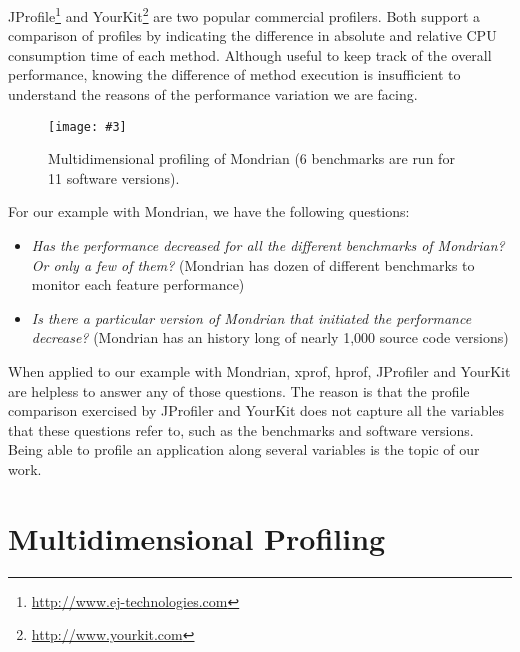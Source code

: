 \documentclass[10pt, conference, compsocconf]{IEEEtran}
\newcommand{\largefig}[4]{
	\begin{figure*}[#1]
		\centering
		\texttt{[image: \#3]}
		\caption{\label{fig:#3}#4}
	\end{figure*}}
\begin{document}
JProfile\footnote{\url{http://www.ej-technologies.com}} and YourKit\footnote{\url{http://www.yourkit.com}} are two popular commercial profilers. Both support a comparison of profiles by indicating the difference in absolute and relative CPU consumption time of each method. Although useful to keep track of the overall performance, knowing the difference of method execution is insufficient to understand the reasons of the performance variation we are facing. 

\largefig{}{1.0}{final2}{Multidimensional profiling of Mondrian (6 benchmarks are run for 11 software versions).}

For our example with Mondrian, we have the following questions:
\begin{itemize}
\item \emph{Has the performance decreased for all the different benchmarks of Mondrian? Or only a few of them?} (Mondrian has dozen of different benchmarks to monitor each feature performance)

\item \emph{Is there a particular version of Mondrian that initiated the performance decrease?} (Mondrian has an history long of nearly 1,000 source code versions)


\end{itemize}

When applied to our example with Mondrian, xprof, hprof, JProfiler and YourKit are helpless to answer any of those questions. The reason is that the profile comparison exercised by JProfiler and YourKit does not capture all the variables that these questions refer to, such as the benchmarks and software versions. Being able to profile an application along several variables is the topic of our work.

\section{Multidimensional Profiling}
\end{document}
